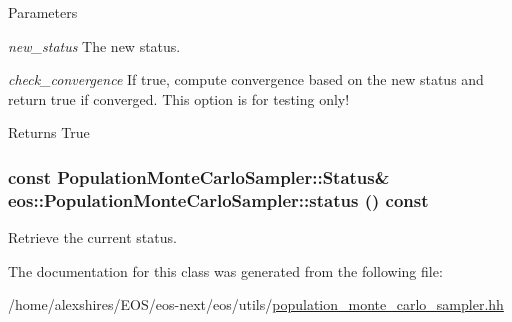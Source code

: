 \begin{DoxyParams}{Parameters}
\item[{\em new\_\-status}]The new status. \item[{\em check\_\-convergence}]If true, compute convergence based on the new status and return true if converged. This option is for testing only! \end{DoxyParams}
\begin{DoxyReturn}{Returns}
True 
\end{DoxyReturn}
\hypertarget{classeos_1_1PopulationMonteCarloSampler_a0557e83dff8bc5befde6a43ede580f84}{
\subsubsection[{status}]{\setlength{\rightskip}{0pt plus 5cm}const {\bf PopulationMonteCarloSampler::Status}\& eos::PopulationMonteCarloSampler::status () const}}
\label{classeos_1_1PopulationMonteCarloSampler_a0557e83dff8bc5befde6a43ede580f84}


Retrieve the current status. 

The documentation for this class was generated from the following file:\begin{DoxyCompactItemize}
\item 
/home/alexshires/EOS/eos-\/next/eos/utils/\hyperlink{population__monte__carlo__sampler_8hh}{population\_\-monte\_\-carlo\_\-sampler.hh}\end{DoxyCompactItemize}
